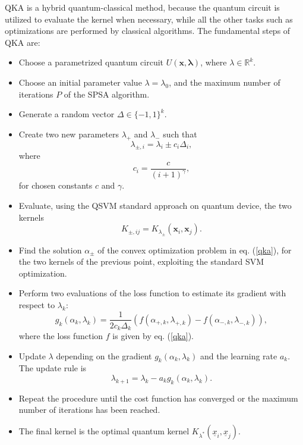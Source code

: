 \documentclass[12pt]{article}
\begin{document}
QKA is a hybrid quantum-classical method, because the quantum circuit is utilized to evaluate the kernel when necessary, while all the other tasks such as optimizations are performed by classical algorithms. The fundamental steps of QKA are:
\begin{itemize}
    \item Choose a parametrized quantum circuit $U(\mathbf{x}, \mathbf{\lambda})$, where $\lambda\in \mathbb{R}^k$.
    \item Choose an initial parameter value $\lambda=\lambda_0$, and the maximum number of iterations $P$ of the SPSA algorithm.
    \item Generate a random vector $\Delta \in \{-1,1\}^k$.
    \item Create two new parameters $\lambda_+$ and $\lambda_-$ such that $$\lambda_{\pm,i}=\lambda_i\pm c_i \Delta_i,$$ where $$c_i=\frac{c}{(i+1)^\gamma},$$ for chosen constants $c$ and $\gamma$. 
    \item Evaluate, using the QSVM standard approach on quantum device, the two kernels $$K_{\pm,ij}=K_{\lambda_{\pm}}(\mathbf{x}_i, \mathbf{x}_j).$$
    \item Find the solution $\alpha_{\pm}$ of the convex optimization problem in eq. (\ref{qka}), for the two kernels of the previous point, exploiting the standard SVM optimization.
    \item Perform two evaluations of the loss function to estimate its gradient with respect to $\lambda_k$: \begin{equation}
        g_k(\alpha_k, \lambda_k)=\frac{1}{2c_k\Delta_k}(f(\alpha_{+,k}, \lambda_{+,k})-f(\alpha_{-,k}, \lambda_{-,k})),
    \end{equation} where the loss function $f$ is given by eq. (\ref{qka}).
    \item Update $\lambda$ depending on the gradient $g_k(\alpha_k, \lambda_k)$ and the learning rate $a_k$. The update rule is \begin{equation}
        \lambda_{k+1}=\lambda_k-a_kg_k(\alpha_k,\lambda_k).
    \end{equation}
    \item Repeat the procedure until the cost function has converged or the maximum number of iterations has been reached. 
    \item The final kernel is the optimal quantum kernel $K_{\lambda^*}(\underline{x}_i, \underline{x}_j).$
\end{itemize}
\end{document}
